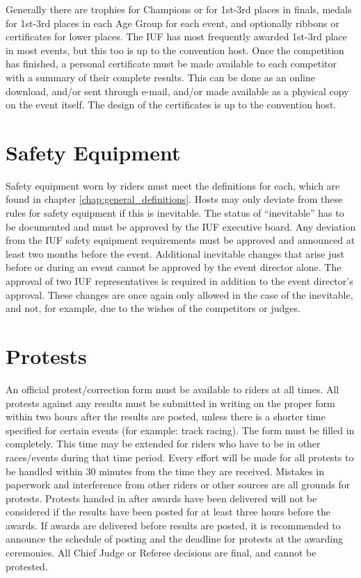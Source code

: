 Generally there are trophies for Champions or for 1st-3rd places in finals, medals for 1st-3rd places in each Age Group for each event, and optionally ribbons or certificates for lower places.
The IUF has most frequently awarded 1st-3rd place in most events, but this too is up to the convention host.
Once the competition has finished, a personal certificate must be made available to each competitor with a summary of their complete results.
This can be done as an online download, and/or sent through e-mail, and/or made available as a physical copy on the event itself.
The design of the certificates is up to the convention host.

\section{Safety Equipment}

Safety equipment worn by riders must meet the definitions for each, which are found in chapter \ref{chap:general_definitions}.
Hosts may only deviate from these rules for safety equipment if this is inevitable.
The status of ``inevitable'' has to be documented and must be approved by the IUF executive board.
Any deviation from the IUF safety equipment requirements must be approved and announced at least two months before the event.
Additional inevitable changes that arise just before or during an event cannot be approved by the event director alone.
The approval of two IUF representatives is required in addition to the event director's approval.
These changes are once again only allowed in the case of the inevitable, and not, for example, due to the wishes of the competitors or judges.

\section{Protests}
An official protest/correction form must be available to riders at all times.
All protests against any results must be submitted in writing on the proper form within two hours after the results are posted, unless there is a shorter time specified for certain events (for example: track racing).
The form must be filled in completely.
This time may be extended for riders who have to be in other races/events during that time period.
Every effort will be made for all protests to be handled within 30 minutes from the time they are received.
Mistakes in paperwork and interference from other riders or other sources are all grounds for protests.
Protests handed in after awards have been delivered will not be considered if the results have been posted for at least three hours before the awards.
If awards are delivered before results are posted, it is recommended to announce the schedule of posting and the deadline for protests at the awarding ceremonies.
All Chief Judge or Referee decisions are final, and cannot be protested.

